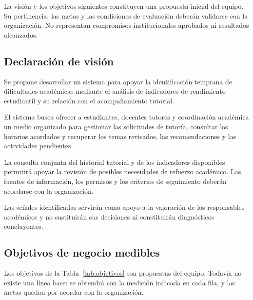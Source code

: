 \documentclass[11pt,a4paper]{article}
\begin{document}
La visión y los objetivos siguientes constituyen una
propuesta inicial del equipo. Su pertinencia, las metas
y las condiciones de evaluación deberán validarse con
la organización. No representan compromisos institucionales
aprobados ni resultados alcanzados.

\subsection{Declaración de visión}

Se propone desarrollar un sistema para apoyar la
identificación temprana de dificultades académicas
mediante el análisis de indicadores de rendimiento
estudiantil y su relación con el acompañamiento tutorial.

El sistema busca ofrecer a estudiantes, docentes tutores
y coordinación académica un medio organizado para
gestionar las solicitudes de tutoría, consultar los
horarios acordados y recuperar los temas revisados,
las recomendaciones y las actividades pendientes.

La consulta conjunta del historial tutorial y de los
indicadores disponibles permitirá apoyar la revisión
de posibles necesidades de refuerzo académico.
Las fuentes de información, los permisos y los criterios
de seguimiento deberán acordarse con la organización.

Las señales identificadas servirán como apoyo a la
valoración de los responsables académicos y no
sustituirán sus decisiones ni constituirán diagnósticos
concluyentes.

\subsection{Objetivos de negocio medibles}

Los objetivos de la Tabla~\ref{tab:objetivos} son propuestas del equipo. Todavía no existe una línea base: se obtendrá con la medición indicada en cada fila, y las metas quedan por acordar con la organización.
\end{document}
